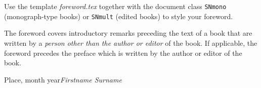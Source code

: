 %
%

\foreword

Use the template \textit{foreword.tex} together with the document class \verb|SNmono| (monograph-type books) or \verb|SNmult| (edited books) to style your foreword. 

The foreword covers introductory remarks preceding the text of a book that are written by a \textit{person other than the author or editor} of the book. If applicable, the foreword precedes the preface which is written by the author or editor of the book.

\vspace{\baselineskip}
\begin{flushright}\noindent
Place, month year\hfill {\it Firstname  Surname}\\
\end{flushright}
